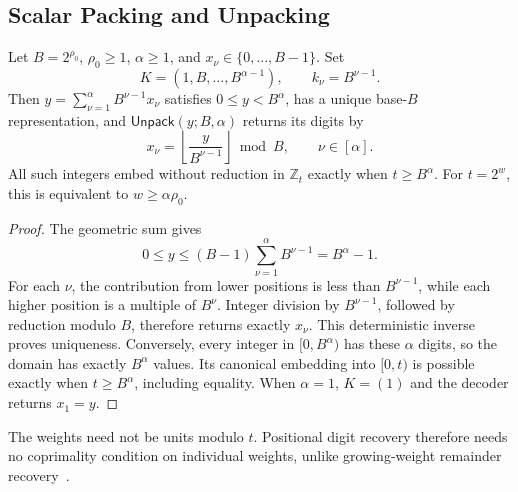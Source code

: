 \subsection{Scalar Packing and Unpacking}
\label{sec:param}
\begin{lemma}
\label{lemma:packing-condition}
Let \(B=2^{\rho_0}\), \(\rho_0\ge1\), \(\alpha\ge1\), and
\(x_{\nu}\in\{0,\ldots,B-1\}\). Set
\begin{equation}
\label{eq:weights}
 K=(1,B,\ldots,B^{\alpha-1}),\qquad k_{\nu}=B^{\nu-1}.
\end{equation}
Then \(y=\sum_{\nu=1}^{\alpha}B^{\nu-1}x_{\nu}\) satisfies
\(0\le y<B^\alpha\), has a unique base-\(B\) representation, and
\(\mathsf{Unpack}(y;B,\alpha)\) returns its digits by
\begin{equation}
\label{eq:unpack}
 x_{\nu}=\left\lfloor\frac{y}{B^{\nu-1}}\right\rfloor\bmod B,
 \qquad \nu\in[\alpha].
\end{equation}
All such integers embed without reduction in \(\mathbb Z_t\) exactly when
\(t\ge B^\alpha\). For \(t=2^w\), this is equivalent to
\(w\ge\alpha\rho_0\).
\end{lemma}
\begin{proof}
The geometric sum gives
\[
 0\le y\le(B-1)\sum_{\nu=1}^{\alpha}B^{\nu-1}=B^\alpha-1.
\]
For each \(\nu\), the contribution from lower positions is less than
\(B^{\nu-1}\), while each higher position is a multiple of \(B^{\nu}\).
Integer division by \(B^{\nu-1}\), followed by reduction modulo \(B\),
therefore returns exactly \(x_{\nu}\). This deterministic inverse proves
uniqueness. Conversely, every integer in \([0,B^\alpha)\) has these
\(\alpha\) digits, so the domain has exactly \(B^\alpha\) values.
Its canonical embedding into \([0,t)\) is possible exactly when
\(t\ge B^\alpha\), including equality. When \(\alpha=1\),
\(K=(1)\) and the decoder returns \(x_1=y\).
\end{proof}

The weights need not be units modulo \(t\). Positional digit recovery
therefore needs no coprimality condition on individual weights, unlike
growing-weight remainder recovery~\cite{mulityquery}.
